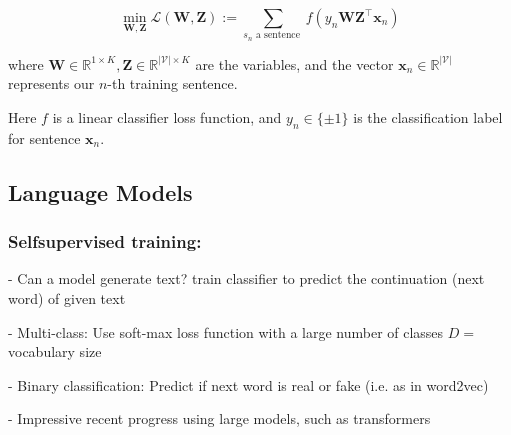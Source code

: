 $$
\min _{\mathbf{W}, \mathbf{Z}} \mathcal{L}(\mathbf{W}, \mathbf{Z}):=\sum_{s_{n} \text { a sentence }} f\left(y_{n} \mathbf{W} \mathbf{Z}^{\top} \mathbf{x}_{n}\right)
$$

where $\mathbf{W} \in \mathbb{R}^{1 \times K}, \mathbf{Z} \in \mathbb{R}^{|\mathcal{V}| \times K}$ are the variables, and the vector $\mathbf{x}_{n} \in \mathbb{R}^{|\mathcal{V}|}$ represents our $n$-th training sentence.

Here $f$ is a linear classifier loss function, and $y_{n} \in\{ \pm 1\}$ is the classification label for sentence $\mathbf{x}_{n}$.


\subsection*{Language Models}
\subsubsection*{Selfsupervised training:}
- Can a model generate text? train classifier to predict the continuation (next word) of given text

- Multi-class:
Use soft-max loss function with a large number of classes $D=$ vocabulary size

- Binary classification: 
Predict if next word is real or fake (i.e. as in word2vec)

- Impressive recent progress using large models, such as transformers
